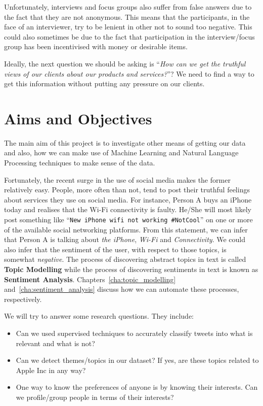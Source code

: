Unfortunately, interviews and focus groups also suffer from false answers due to the fact that they
are not anonymous. This means that the participants, in the face of an interviewer, try to be
lenient in other not to sound too negative. This could also sometimes be due to the fact that
participation in the interview/focus group has been incentivised with money or desirable items.

Ideally, the next question we should be asking is ``\textit{How can we get the truthful views of our
clients about our products and services?}''? We need to find a way to get this information without
putting any pressure on our clients.

\section{Aims and Objectives}
\label{sec:objectives}
The main aim of this project is to investigate other means of getting our data and also, how we can
make use of Machine Learning and Natural Language Processing techniques to make sense of the data.

Fortunately, the recent surge in the use of social media makes the former relatively easy. People,
more often than not, tend to post their truthful feelings about services they use on social media.
For instance, Person A buys an iPhone today and realises that the Wi-Fi connectivity is faulty.
He/She will most likely post something like ``\texttt{New iPhone wifi not working \#NotCool}'' on
one or more of the available social networking platforms. From this statement, we can infer that
Person A is talking about \textit{the iPhone}, \textit{Wi-Fi} and \textit{Connectivity}. We could
also infer that the sentiment of the user, with respect to those topics, is somewhat
\textit{negative}. The process of discovering abstract topics in text is called \textbf{Topic
Modelling} while the process of discovering sentiments in text is known as \textbf{Sentiment
Analysis}. Chapters~\ref{cha:topic_modelling} and~\ref{cha:sentiment_analysis} discuss how we can
automate these processes, respectively.

We will try to answer some research questions. They include:
\begin{itemize}
  \item Can we used supervised techniques to accurately classify tweets into what is relevant and
    what is not?
  \item Can we detect themes/topics in our dataset? If yes, are these topics related to Apple Inc in
    any way?
  \item One way to know the preferences of anyone is by knowing their interests. Can we
    profile/group people in terms of their interests?
\end{itemize}


